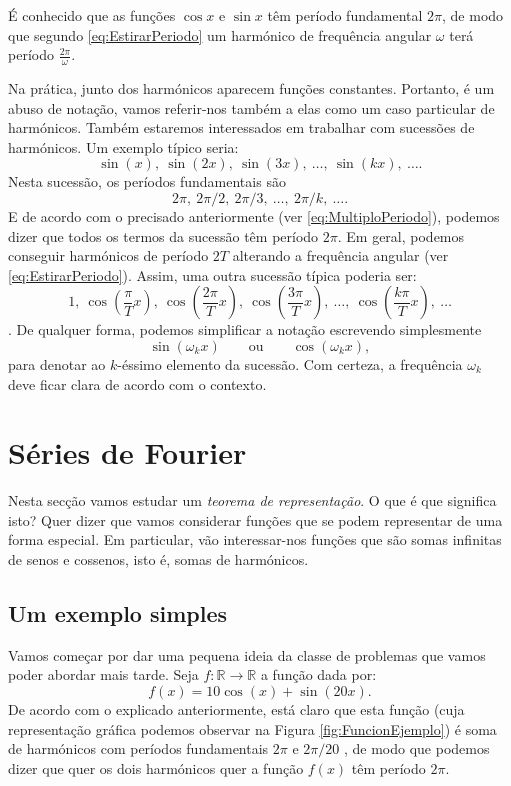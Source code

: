 É conhecido que as funções $\cos x$ e $\sin x$ têm período fundamental $2\pi$, de modo que segundo \eqref{eq:EstirarPeriodo} um harmónico de frequência angular $\omega$ terá período $\frac{2\pi}{\omega}$.

 Na prática, junto dos harmónicos aparecem funções constantes. Portanto, é um abuso de notação, vamos referir-nos também a elas como um caso particular de harmónicos. Também estaremos interessados em trabalhar com sucessões de harmónicos. Um exemplo típico seria:
\[
\sin(x),\ \sin(2x),\ \sin(3x),\ \ldots,\ \sin(kx),\ \ldots .
\]
Nesta sucessão, os períodos fundamentais são
\[
2\pi,\ 2\pi/2,\ 2\pi/3,\ \ldots,\ 2\pi/k,\ \ldots .
\]
E de acordo com o precisado anteriormente (ver \eqref{eq:MultiploPeriodo}), podemos dizer que todos os termos da sucessão têm período $2\pi$. Em geral, podemos conseguir harmónicos de período $2T$ alterando a frequência angular (ver \eqref{eq:EstirarPeriodo}). Assim, uma outra sucessão típica poderia ser:
\[1,\ \cos\left(\frac{ \pi}{T}x\right),\ \cos\left(\frac{2 \pi}{T}x\right),\ \cos\left(\frac{3 \pi}{T}x\right),\ \ldots,\ \cos\left(\frac{k \pi}{T}x\right),\ \ldots\].
De qualquer forma, podemos simplificar a notação escrevendo simplesmente
\[
\sin(\omega_k x)\qquad \text{ou}\qquad \cos(\omega_kx),
\]
para denotar ao $k$-éssimo elemento da sucessão. Com certeza, a frequência $\omega_k$ deve ficar clara de acordo com o contexto.

\section{Séries de Fourier}\label{s:s2}
Nesta secção vamos estudar um \textit{teorema de representação}. O que é que significa isto? Quer dizer que vamos considerar funções que se podem representar de uma forma especial. Em particular, vão interessar-nos funções que são somas infinitas de senos e cossenos, isto é, somas de harmónicos.



\subsection{Um exemplo simples}
Vamos começar por dar uma pequena ideia da classe de problemas que vamos poder abordar mais tarde. Seja $f:\mathbb{R}\longrightarrow\mathbb{R}$ a função dada por:
\[
f(x) = 10\cos (x) + \sin (20x).
\]
De acordo com o explicado anteriormente, está claro que esta função (cuja representação gráfica podemos observar na Figura \ref{fig:FuncionEjemplo}) é soma de harmónicos com períodos fundamentais $2\pi$ e $2\pi/ 20$ , de modo que podemos dizer que quer os dois harmónicos quer a função $f(x)$ têm período $2\pi$.

